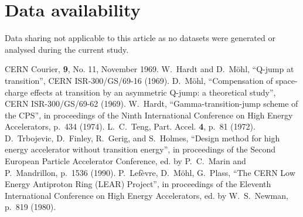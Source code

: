 \documentclass{article}
\begin{document}
\section*{Data availability}
%
Data sharing not applicable to this article as no datasets were generated or analysed during the current study.
%
\begin{thebibliography}{99}
%
 CERN Courier, {\bf 9}, No. 11, November 1969.
%
 W.~Hardt and D.~M\"ohl, ``Q-jump at transition'', CERN ISR-300/GS/69-16 (1969).
%
 D.~M\"ohl, ``Compensation of space-charge effects at transition by an asymmetric Q-jump: a theoretical study'', CERN ISR-300/GS/69-62 (1969).
%
 W.~Hardt, ``Gamma-transition-jump scheme of the CPS'', in proceedings of the Ninth International Conference on High Energy Accelerators, p.~434 (1974).
%
 L.~C.~Teng, Part. Accel. {\bf 4}, p.~81 (1972).
%
 D.~Trbojevic, D.~Finley, R.~Gerig, and S.~Holmes, ``Design method for high energy accelerator without transition energy'', in proceedings of the Second European Particle Accelerator Conference, ed. by P.~C.~Marin and P.~Mandrillon, p.~1536 (1990).
%
 P.~Lef\`evre, D.~M\"ohl, G.~Plass, ``The CERN Low Energy Antiproton Ring (LEAR) Project'', in proceedings of the Eleventh International Conference on High Energy Accelerators, ed. by W.~S.~Newman, p.~819 (1980).


\end{thebibliography}
\end{document}

